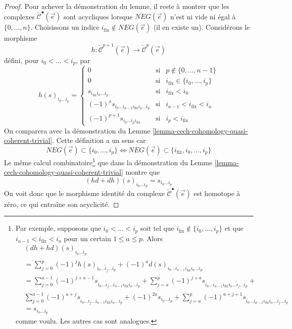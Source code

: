 \begin{proof}
\medskip\noindent
Pour achever la démonstration du lemme, il reste à montrer que les complexes
$\check{\mathcal{C}}^\bullet(\vec{e})$ sont acycliques lorsque
$NEG(\vec{e})$ n'est ni vide ni égal à $\{0, \ldots, n\}$.
Choisissons un indice $i_{\text{fix}} \not \in NEG(\vec{e})$ (il en existe un).
Considérons le morphisme
$$
h :
\check{\mathcal{C}}^{p + 1}(\vec{e})
\to
\check{\mathcal{C}}^p(\vec{e})
$$
défini, pour $i_0 < \ldots < i_p$, par
$$
h(s)_{i_0 \ldots i_p} =
\left\{
\begin{matrix}
0 & \text{si} & p \not \in \{0, \ldots, n - 1\} \\
0 & \text{si} & i_{\text{fix}} \in \{i_0, \ldots, i_p\} \\
s_{i_{\text{fix}} i_0 \ldots i_p} & \text{si} & i_{\text{fix}} < i_0 \\
(-1)^a s_{i_0 \ldots i_{a - 1} i_{\text{fix}} i_a \ldots i_p} &
\text{si} & i_{a - 1} < i_{\text{fix}} < i_a \\
(-1)^{p + 1} s_{i_0 \ldots i_p i_{\text{fix}}} &
\text{si} & i_p < i_{\text{fix}}
\end{matrix}
\right.
$$
On comparera avec la démonstration du
Lemme \ref{lemma-cech-cohomology-quasi-coherent-trivial}.
Cette définition a un sens car
$$
NEG(\vec{e}) \subset \{i_0, \ldots, i_p\}
\Leftrightarrow
NEG(\vec{e}) \subset \{i_{\text{fix}}, i_0, \ldots, i_p\}
$$
Le même calcul combinatoire\footnote{
Par exemple, supposons que $i_0 < \ldots < i_p$ soit tel que
$i_{\text{fix}} \not \in \{i_0, \ldots, i_p\}$ et que
$i_{a - 1} < i_{\text{fix}} < i_a$ pour un certain $1 \leq a \leq p$. Alors
\begin{align*}
&
(dh + hd)(s)_{i_0 \ldots i_p} \\
& =
\sum\nolimits_{j = 0}^p
(-1)^j
h(s)_{i_0 \ldots \hat i_j \ldots i_p}
+
(-1)^a d(s)_{i_0 \ldots i_{a - 1} i_{\text{fix}} i_a \ldots i_p}\\
& =
\sum\nolimits_{j = 0}^{a - 1}
(-1)^{j + a - 1}
s_{i_0 \ldots \hat i_j \ldots i_{a - 1} i_{\text{fix}} i_a \ldots i_p} +
\sum\nolimits_{j = a}^p
(-1)^{j + a}
s_{i_0 \ldots i_{a - 1} i_{\text{fix}} i_a \ldots \hat i_j \ldots i_p}
+ \\
&
\sum\nolimits_{j = 0}^{a - 1}
(-1)^{a + j}
s_{i_0 \ldots \hat i_j \ldots i_{a - 1} i_{\text{fix}} i_a \ldots i_p} +
(-1)^{2a} s_{i_0 \ldots i_p} +
\sum\nolimits_{j = a}^p
(-1)^{a + j + 1}
s_{i_0 \ldots i_{a - 1} i_{\text{fix}} i_a \ldots \hat i_j \ldots i_p}
\\
& =
s_{i_0 \ldots i_p}
\end{align*}
comme voulu. Les autres cas sont analogues.}
que dans la démonstration du Lemme \ref{lemma-cech-cohomology-quasi-coherent-trivial}
montre que
$$
(hd + dh)(s)_{i_0 \ldots i_p}
=
s_{i_0 \ldots i_p}
$$
On voit donc que le morphisme identité du complexe
$\check{\mathcal{C}}^\bullet(\vec{e})$ est homotope à zéro,
ce qui entraîne son acyclicité.
\end{proof}


